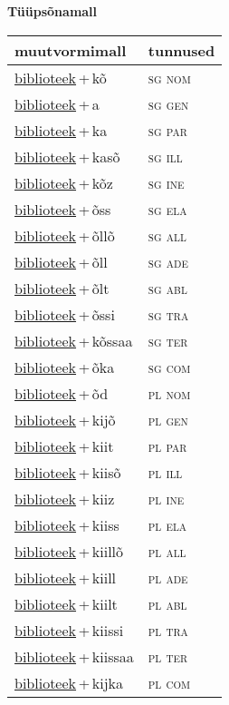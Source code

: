 
\vspace{1.8em}
\begin{minipage}{\textwidth}
\textbf{Tüüpsõnamall \,}\\

\begin{sideways}
\begin{tabular}{l l}
muutvormimall & tunnused \\
\hline
\underline{biblioteek}\,+\,kõ & \textsc{ sg nom } \\
\underline{biblioteek}\,+\,a & \textsc{ sg gen } \\
\underline{biblioteek}\,+\,ka & \textsc{ sg par } \\
\underline{biblioteek}\,+\,kasõ & \textsc{ sg ill } \\
\underline{biblioteek}\,+\,kõz & \textsc{ sg ine } \\
\underline{biblioteek}\,+\,õss & \textsc{ sg ela } \\
\underline{biblioteek}\,+\,õllõ & \textsc{ sg all } \\
\underline{biblioteek}\,+\,õll & \textsc{ sg ade } \\
\underline{biblioteek}\,+\,õlt & \textsc{ sg abl } \\
\underline{biblioteek}\,+\,õssi & \textsc{ sg tra } \\
\underline{biblioteek}\,+\,kõssaa & \textsc{ sg ter } \\
\underline{biblioteek}\,+\,õka & \textsc{ sg com } \\
\underline{biblioteek}\,+\,õd & \textsc{ pl nom } \\
\underline{biblioteek}\,+\,kijõ & \textsc{ pl gen } \\
\underline{biblioteek}\,+\,kiit & \textsc{ pl par } \\
\underline{biblioteek}\,+\,kiisõ & \textsc{ pl ill } \\
\underline{biblioteek}\,+\,kiiz & \textsc{ pl ine } \\
\underline{biblioteek}\,+\,kiiss & \textsc{ pl ela } \\
\underline{biblioteek}\,+\,kiillõ & \textsc{ pl all } \\
\underline{biblioteek}\,+\,kiill & \textsc{ pl ade } \\
\underline{biblioteek}\,+\,kiilt & \textsc{ pl abl } \\
\underline{biblioteek}\,+\,kiissi & \textsc{ pl tra } \\
\underline{biblioteek}\,+\,kiissaa & \textsc{ pl ter } \\
\underline{biblioteek}\,+\,kijka & \textsc{ pl com } \\
\end{tabular}
\end{sideways}
\label{tab:tüüpsõnamall-biblioteekkõ}

\end{minipage}

